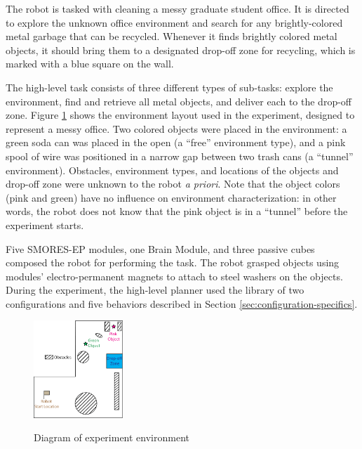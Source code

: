 \documentclass[conference]{IEEEtran}
\begin{document}
The robot is tasked with cleaning a messy graduate student office.  It is directed to explore the unknown office environment and search for any brightly-colored metal garbage that can be recycled.  Whenever it finds brightly colored metal objects, it should bring them to a designated drop-off zone for recycling, which is marked with a blue square on the wall.

The high-level task consists of three different types of sub-tasks: explore the environment, find and retrieve all metal objects, and deliver each to the drop-off zone. Figure \ref{fig:map} shows the environment layout used in the experiment, designed to represent a messy office. Two colored objects were placed in the environment: a green soda can was placed in the open (a ``free'' environment type), and a pink spool of wire was positioned in a narrow gap between two trash cans (a ``tunnel'' environment). Obstacles, environment types, and locations of the objects and drop-off zone were unknown to the robot \textit{a priori}.  Note that the object colors (pink and green) have no influence on environment characterization: in other words, the robot does not know that the pink object is in a ``tunnel''  before the experiment starts.
 

Five SMORES-EP modules, one Brain Module, and three passive cubes composed the robot for performing the task. The robot grasped objects using modules' electro-permanent magnets to attach to steel washers on the objects.
During the experiment, the high-level planner used the library of two configurations and five behaviors described in Section \ref{sec:configuration-specifics}.

\begin{figure}
\begin{center}
\includegraphics[width=0.3\textwidth]{images/RSSMap.png}
\caption{Diagram of experiment environment}
\vspace{-2em}
\label{fig:map}
\end{center}
\end{figure}
\end{document}
